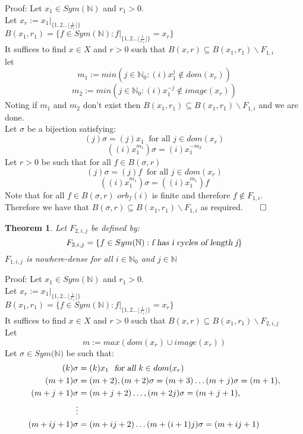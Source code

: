 \documentclass{report}
\newtheorem{theorem}{Theorem}[section]
\begin{document}
Proof: Let $x_1 \in Sym(\mathbb{N})$ and $r_1>0$.\\
Let $x_r:=x_1\vert_{\{1,2 \ldots \lfloor \frac{1}{r_1}\rfloor\}}$\\
$B(x_1,r_1)= \{f \in Sym(\mathbb{N}): f\vert_{\{1,2 \ldots  \lfloor \frac{1}{r_1}\rfloor\}}=x_r\}$\\
It suffices to find $x\in X$ and $r>0$ such that  $B(x,r)\subseteq B(x_1,r_1)\backslash F_{1,i}$\\
let $$m_1:= min(j\in \mathbb{N}_0:(i)x_1^j\notin dom(x_r))$$
$$m_2:= min(j\in \mathbb{N}_0:(i)x_1^{-j}\notin image(x_r))$$
Noting if $m_1$ and $m_2$ don't exist then  $B(x_1,r_1)\subseteq B(x_1,r_1)\backslash F_{1,i}$ and we are done.\\
Let $\sigma$ be a bijection satisfying:
$$(j)\sigma=(j)x_1\ \text{ for all } j \in dom(x_r)$$
$$((i)x_1^{m_1})\sigma=(i)x_1^{-m_2}$$
Let $r > 0$ be such that for all $f \in B(\sigma,r)$\\
$$(j)\sigma=(j)f\ \text{ for all } j \in dom(x_r)$$
$$((i)x_1^{m_1})\sigma=((i)x_1^{m_1})f$$
Note that for all $f \in B(\sigma,r)$ $orb_f(i)$ is finite and therefore $f \notin F_{1,i}$.\\
Therefore we have that $B(\sigma,r)\subseteq B(x_1,r_1)\backslash F_{1,i}$ as required.$\qed$
\begin{theorem} \label{nowhere-dense finite}
Let $F_{2,i,j}$ be defined by:
$$F_{2,i,j} = \{f \in Sym(\mathbb{N}): \textsl{f has i cycles of length j}\}$$
$F_{1,i,j}$ is nowhere-dense for all $i \in \mathbb{N}_0$ and $j \in \mathbb{N}$
\end{theorem}\par
Proof: Let $x_1 \in Sym(\mathbb{N})$ and $r_1>0$.\\
Let $x_r:=x_1\vert_{\{1,2 \ldots \lfloor \frac{1}{r_1}\rfloor\}}$\\
$B(x_1,r_1)= \{f \in Sym(\mathbb{N}): f\vert_{\{1,2 \ldots \lfloor \frac{1}{r_1}\rfloor\}}=x_r\}$\\
It suffices to find $x\in X$ and $r>0$ such that $B(x,r)\subseteq B(x_1,r_1)\backslash F_{2,i,j}$\\
Let $$m := max(dom(x_r)\cup image(x_r))$$
Let $\sigma\in Sym(\mathbb{N)}$ be such that:
\begin{align*}
(k)\sigma&=(k)x_1\ \textsl{ for all } k \in dom(x_r)\\
(m+1)\sigma &=(m+2), (m+2)\sigma = (m+3) \ldots (m+j)\sigma = (m+1),\\
(m+j+1)\sigma &= (m+j+2)\ldots,(m+2j)\sigma=(m+j+1),\\
\vdots\\
(m+ij+1)\sigma &= (m+ij+2)\ldots (m+(i+1)j)\sigma=(m+ij+1)
\end{align*}
\end{document}
